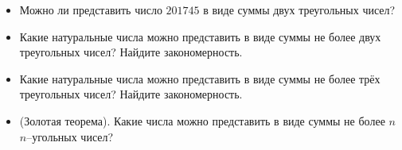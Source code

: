 
\begin{itemize}
\item Можно ли представить число $201745$ в виде суммы двух треугольных чисел?
\item Какие натуральные числа можно представить в виде суммы не более двух треугольных чисел? Найдите закономерность.
\item Какие натуральные числа можно представить в виде суммы не более трёх треугольных чисел? Найдите закономерность.
\item (Золотая теорема). Какие числа можно представить в виде суммы не более $n$ $n$--угольных чисел?

\end{itemize}